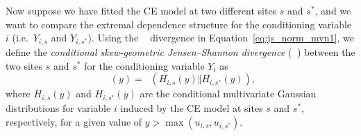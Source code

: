 \documentclass[
  12pt]{article}
\newcommand{\JSGa}{\mathop{\mathrm{JS}^{\mathrm{G}_{\lambda}}}\nolimits}
\newcommand{\cJSGa}[1]{\mathop{\mathrm{cJS}_{i, #1}^{\mathrm{G}_{\lambda}}}\nolimits}
\begin{document}
Now suppose we have fitted the CE model at two different sites $s$ and $s^*$, and we want to compare the extremal dependence structure for the conditioning variable $i$ (i.e.\ $Y_{i, s}$ and $Y_{i, s^*}$).%
Using the $\JSGa{}$ divergence in Equation~\eqref{eq:js_norm_mvn1}, we define the \textit{conditional skew-geometric Jensen--Shannon divergence} ($\cJSGa{s, s^*}$) between the two sites $s$ and $s^*$ for the conditioning variable $Y_i$ as
\begin{equation} \label{eq:cjsga}
  \cJSGa{s, s^*}(y) = \JSGa{}\left(H_{i, s}(y) \Vert H_{i, s^*}(y)\right),
\end{equation}
where $H_{i, s}(y)$ and $H_{i, s^*}(y)$ are the conditional multivariate Gaussian distributions for variable $i$ induced by the CE model at sites $s$ and $s^*$, respectively, for a given value of $y > \max(u_{i, s}, u_{i, s^*})$.  
\end{document}
